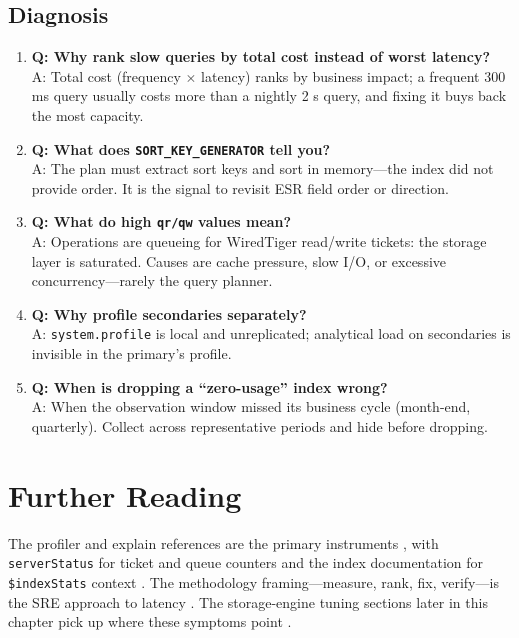 \subsection{Diagnosis}
\begin{enumerate}
    \item \textbf{Q: Why rank slow queries by total cost instead of worst latency?}\\
    A: Total cost (frequency $\times$ latency) ranks by business impact; a frequent 300 ms query usually costs more than a nightly 2 s query, and fixing it buys back the most capacity.

    \item \textbf{Q: What does \texttt{SORT\_KEY\_GENERATOR} tell you?}\\
    A: The plan must extract sort keys and sort in memory---the index did not provide order. It is the signal to revisit ESR field order or direction.

    \item \textbf{Q: What do high \texttt{qr/qw} values mean?}\\
    A: Operations are queueing for WiredTiger read/write tickets: the storage layer is saturated. Causes are cache pressure, slow I/O, or excessive concurrency---rarely the query planner.

    \item \textbf{Q: Why profile secondaries separately?}\\
    A: \texttt{system.profile} is local and unreplicated; analytical load on secondaries is invisible in the primary's profile.

    \item \textbf{Q: When is dropping a ``zero-usage'' index wrong?}\\
    A: When the observation window missed its business cycle (month-end, quarterly). Collect across representative periods and hide before dropping.
\end{enumerate}

\section{Further Reading}
The profiler and explain references are the primary instruments \cite{mongodbProfilerDocs,mongodbExplainDocs}, with \texttt{serverStatus} for ticket and queue counters \cite{mongodbServerStatusDocs} and the index documentation for \texttt{\$indexStats} context \cite{mongodbIndexesDocs}. The methodology framing---measure, rank, fix, verify---is the SRE approach to latency \cite{sreBook}. The storage-engine tuning sections later in this chapter pick up where these symptoms point \cite{mongodbWiredTigerDocs}.

